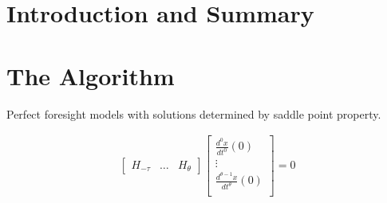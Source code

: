 \documentclass[1p]{elsarticle}
\begin{document}





\newpage

\section{Introduction and Summary}
\label{sec:intro}



\section{The Algorithm}
\label{sec:algorithm}

Perfect foresight models with solutions determined by saddle point property.

\begin{gather*}
  \begin{bmatrix}
    H_{-\tau}&\ldots&H_{\theta}
  \end{bmatrix}
  \begin{bmatrix}
    \frac{d^0x}{dt^0}(0)\\
\vdots\\
    \frac{d^{\theta-1}x}{dt^{\theta}}(0)\\
  \end{bmatrix}=0
\end{gather*}
\end{document}
